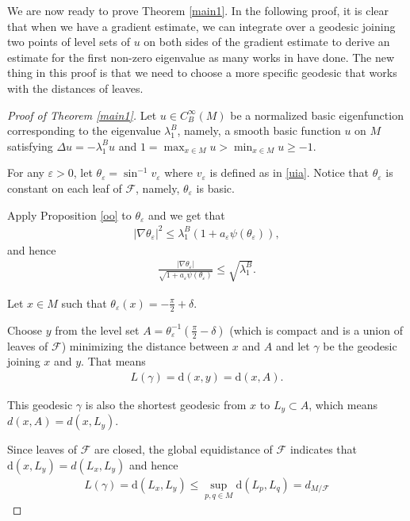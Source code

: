 \documentclass[11pt]{amsart}
\def\d{\mathrm{d}}
\begin{document}
 We are now ready to prove Theorem \ref{main1}. In the following proof, it is clear that when we have a gradient estimate, we can integrate over a geodesic joining two points of level sets of $u$ on both sides of the gradient estimate to derive an estimate for the first non-zero eigenvalue as many works in \cite{liyau, zhongyang} have done. The new thing in this proof is that we need to choose a more specific geodesic that works with the distances of leaves.
        \begin{proof}[Proof of Theorem \ref{main1}]

        Let $u\in C^\infty_B(M)$ be a normalized basic eigenfunction corresponding to the eigenvalue $\lambda_1^B$, namely, a smooth basic function $u$ on $M$ satisfying $\Delta u=-\lambda_1^B u$ and $1=\max_{x\in M} u>\min _{x\in M}u\geq -1$. 

        For any $\varepsilon>0$, let $\theta_\varepsilon=\sin^{-1}v_\varepsilon$ where $v_\varepsilon$ is defined as in \ref{uia}. Notice that $\theta_\varepsilon$ is constant on each leaf of $\mathcal{F}$, namely, $\theta_\varepsilon$ is basic.
        
        Apply Proposition \ref{oo} to $\theta_\varepsilon$ and we get that
        \begin{align}\label{uiia}
            \vert\nabla\theta_\varepsilon\vert^2\leq\lambda_1^B(1+a_\varepsilon\psi(\theta_\varepsilon)),
        \end{align} and hence
        \begin{align}
            \label{aaaaa}\frac{\vert\nabla\theta_\varepsilon\vert}{\sqrt{1+a_\varepsilon\psi(\theta_\varepsilon)}}\leq\sqrt{\lambda_1^B}.
        \end{align}

        Let $x\in M$ such that $\theta_\varepsilon(x)=-\frac{\pi}{2}+\delta$.

        
        Choose $y$ from the level set $A=\theta_\varepsilon^{-1}(\frac{\pi}{2}-\delta)$ (which is compact and is a union of leaves of $\mathcal{F}$) minimizing the distance between $x$ and $A$ and let $\gamma
        $ be the geodesic joining $x$ and $y$. That means
        \begin{align}
            L(\gamma)=\d(x,y)=\d(x,A).
        \end{align}

        This geodesic $\gamma$ is also the shortest geodesic from $x$ to $L_y\subset A$, which means $d(x,A)=d(x,L_y)$.

        Since leaves of $\mathcal{F}$ are closed, the global equidistance of $\mathcal{F}$ indicates that $\d(x,L_y)=d(L_x,L_y)$ and hence
        \begin{align}
            L(\gamma)=\d(L_x,L_y)\leq\sup_{p,q\in M}\d(L_p,L_q)=d_{M/\mathcal{F}}
        \end{align}


\end{proof}
\end{document}
